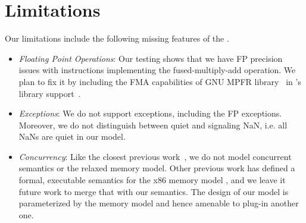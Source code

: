 \section{Limitations}\label{sec:limit}
Our limitations include the following missing features of the \ISA.
%
\begin{itemize}
 \item {\em Floating Point Operations\/}: Our testing shows that we have FP precision issues with instructions implementing the fused-multiply-add operation. We plan to fix it by including the FMA capabilities of GNU MPFR library~\cite{GNUMPFR} in \K's library support~\cite{MPFRJAVA}.
 \item {\em Exceptions\/}: We do not support exceptions, including the FP exceptions. Moreover, we do not distinguish between quiet and signaling NaN, i.e. all NaNs are quiet in our model.
 \item {\em Concurrency\/}: Like the closest previous work~\cite{Goel:FMCAD14,Heule2016a}, we do not model concurrent semantics or the relaxed memory model. Other previous work has defined a formal, executable semantics for the x86 memory model \cite{Sarkar:POPL09,Owens:x86-TSO}, and we leave it future work to merge that with our semantics. The design of our model  is parameterized by the memory model and hence amenable to plug-in another one.
\end{itemize}
